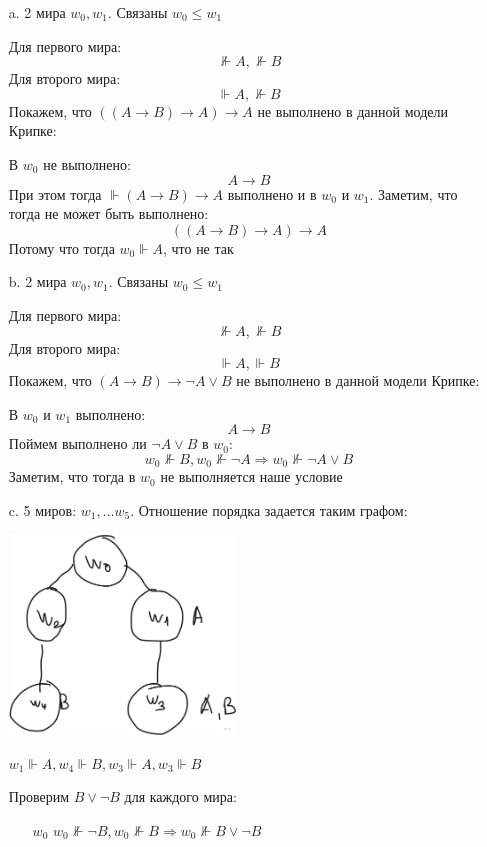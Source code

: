\begin{enumerate}
    \item[a.] 2 мира $w_0, w_1$.  Связаны $w_0 \leq w_1$ 

    Для первого мира:
$$\not\Vdash A, \not \Vdash B$$
    Для второго мира:
$$\Vdash A, \not \Vdash B$$
    Покажем, что $((A \rightarrow B) \rightarrow A) \rightarrow A$ не выполнено в данной модели Крипке:

    В $w_0$ не выполнено: 
    $$A \rightarrow B$$
    При этом тогда $\Vdash (A \rightarrow B) \rightarrow A$ выполнено и в $w_0$ и $w_1$. Заметим, что тогда не может быть выполнено:
    $$((A \rightarrow B) \rightarrow A) \rightarrow A$$
    Потому что тогда $w_0 \Vdash A$, что не так
    
    \item[b.] 2 мира $w_0, w_1$. Связаны $w_0 \leq w_1$ 

    Для первого мира:
$$\not\Vdash A, \not \Vdash B$$
    Для второго мира:
$$\Vdash A, \Vdash B$$
    Покажем, что $(A \rightarrow B) \rightarrow \neg A \lor B$ не выполнено в данной модели Крипке:

    В $w_0$ и $w_1$ выполнено: 
    $$A \rightarrow B$$
    Поймем выполнено ли $\neg A \lor B$ в $w_0$:
    $$w_0 \not \Vdash B, w_0 \not \Vdash \neg A \Rightarrow w_0 \not \Vdash \neg A  \lor B$$
    Заметим, что тогда в $w_0$ не выполняется наше условие
    \pagebreak
    \item[c.] 5 миров: $w_1, \ldots w_5$. Отношение порядка задается таким графом:
    \begin{center}
         \includegraphics[width=6cm]{assets/graf.jpg}
    \end{center}
    $w_1 \Vdash A, w_4 \Vdash B, w_3 \Vdash A, w_3 \Vdash B$

    Проверим $B \lor \neg B$ для каждого мира:
    \begin{enumerate}
        \item[$w_0$] $w_0 \not\Vdash \neg B,w_0 \not \Vdash B \Rightarrow w_0 \not \Vdash B \lor \neg B $
        

\end{enumerate}
\end{enumerate}

